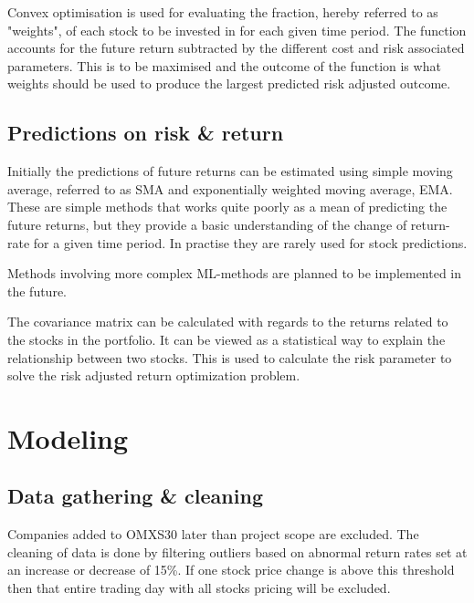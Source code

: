\documentclass{LTHtwocol} %
\begin{document}

Convex optimisation is used for evaluating the fraction, hereby referred to as "weights", of each stock to be invested in for each given time period. The function accounts for the future return subtracted by the different cost and risk associated parameters. This is to be maximised and the outcome of the function is what weights should be used to produce the largest predicted risk adjusted outcome.\cite{Boyd}

\subsection{Predictions on risk \& return}
Initially the predictions of future returns can be estimated using simple moving average, referred to as SMA and exponentially weighted moving average, EMA. These are simple methods that works quite poorly as a mean of predicting the future returns, but they provide a basic understanding of the change of return-rate for a given time period. In practise they are rarely used for stock predictions. 

Methods involving more complex ML-methods are planned to be implemented in the future.

The covariance matrix can be calculated with regards to the returns related to the stocks in the portfolio. It can be viewed as a statistical way to explain the relationship between two stocks.\cite{covar} This is used to calculate the risk parameter to solve the risk adjusted return optimization problem.

\section{Modeling}

\subsection{Data gathering \& cleaning}
Companies added to OMXS30 later than project scope are excluded. The cleaning of data is done by filtering outliers based on abnormal return rates set at an increase or decrease of 15\%. If one stock price change is above this threshold then that entire trading day with all stocks pricing will be excluded.

\end{document}
